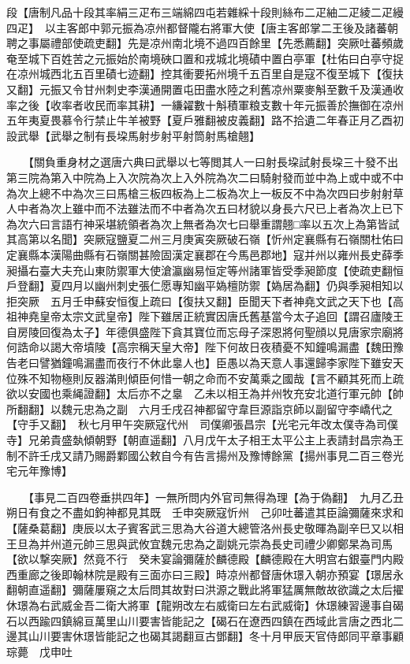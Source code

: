 段【唐制凡品十段其率絹三疋布三端綿四屯若雜綵十段則絲布二疋紬二疋綾二疋縵四疋】　以主客郎中郭元振為凉州都督隴右將軍大使【唐主客郎掌二王後及諸蕃朝聘之事屬禮部使疏吏翻】先是凉州南北境不過四百餘里【先悉薦翻】突厥吐蕃頻歲奄至城下百姓苦之元振始於南境硤口置和戎城北境磧中置白亭軍【杜佑曰白亭守捉在凉州城西北五百里磧七迹翻】控其衝要拓州境千五百里自是寇不復至城下【復扶又翻】元振又令甘州刺史李漢通開置屯田盡水陸之利舊凉州粟麥斛至數千及漢通收率之後【收率者收民而率其耕】一縑糴數十斛積軍粮支數十年元振善於撫御在凉州五年夷夏畏慕令行禁止牛羊被野【夏戶雅翻被皮義翻】路不拾遺二年春正月乙酉初設武舉【武舉之制有長垜馬射步射平射筒射馬槍翹】

　　【關負重身材之選唐六典曰武舉以七等閲其人一曰射長垜試射長垜三十發不出第三院為第入中院為上入次院為次上入外院為次二曰騎射發而並中為上或中或不中為次上總不中為次三曰馬槍三板四板為上二板為次上一板反不中為次四曰步射射草人中者為次上雖中而不法雖法而不中者為次五曰材貌以身長六尺已上者為次上已下為次六曰言語冇神采堪統領者為次上無者為次七曰舉重謂翹□率以五次上為第皆試其高第以名聞】突厥寇鹽夏二州三月庚寅突厥破石嶺【忻州定襄縣有石嶺關杜佑曰定襄縣本漢陽曲縣有石嶺關甚險固漢定襄郡在今馬邑郡地】寇并州以雍州長史薛季昶攝右臺大夫充山東防禦軍大使滄瀛幽易恒定等州諸軍皆受季昶節度【使疏吏翻恒戶登翻】夏四月以幽州刺史張仁愿專知幽平媯檀防禦【媯居為翻】仍與季昶相知以拒突厥　五月壬申蘇安恒復上疏曰【復扶又翻】臣聞天下者神堯文武之天下也【高祖神堯皇帝太宗文武皇帝】陛下雖居正統實因唐氏舊基當今太子追回【謂召廬陵王自房陵回復為太子】年德俱盛陛下貪其寶位而忘母子深恩將何聖顔以見唐家宗廟將何誥命以謁大帝墳陵【高宗稱天皇大帝】陛下何故日夜積憂不知鐘鳴漏盡【魏田豫告老曰譬猶鐘鳴漏盡而夜行不休此辠人也】臣愚以為天意人事還歸李家陛下雖安天位殊不知物極則反器滿則傾臣何惜一朝之命而不安萬乘之國哉【言不顧其死而上疏欲以安國也乘䋲證翻】太后亦不之辠　乙未以相王為并州牧充安北道行軍元帥【帥所翻翻】以魏元忠為之副　六月壬戌召神都留守韋巨源詣京師以副留守李嶠代之【守手又翻】　秋七月甲午突厥寇代州　司僕卿張昌宗【光宅元年改太僕寺為司僕寺】兄弟貴盛埶傾朝野【朝直遥翻】八月戊午太子相王太平公主上表請封昌宗為王制不許壬戌又請乃賜爵鄴國公敕自今有告言揚州及豫博餘黨【揚州事見二百三卷光宅元年豫博】

　　【事見二百四卷垂拱四年】一無所問内外官司無得為理【為于偽翻】　九月乙丑朔日有食之不盡如鉤神都見其既　壬申突厥寇忻州　己卯吐蕃遣其臣論彌薩來求和【薩桑葛翻】庚辰以太子賓客武三思為大谷道大總管洛州長史敬暉為副辛巳又以相王旦為并州道元帥三思與武攸宜魏元忠為之副姚元崇為長史司禮少卿鄭杲為司馬【欲以撃突厥】然竟不行　癸未宴論彌薩於麟德殿【麟德殿在大明宫右銀臺門内殿西重廊之後即翰林院是殿有三面亦曰三殿】時凉州都督唐休璟入朝亦預宴【璟居永翻朝直遥翻】彌薩屢窺之太后問其故對曰洪源之戰此將軍猛厲無敵故欲識之太后擢休璟為右武威金吾二衛大將軍【龍朔改左右威衛曰左右武威衛】休璟練習邊事自碣石以西踰四鎮綿亘萬里山川要害皆能記之【碣石在遼西四鎮在西域此言唐之西北二邊其山川要害休璟皆能記之也碣其謁翻亘古鄧翻】冬十月甲辰天官侍郎同平章事顧琮薨　戊申吐

